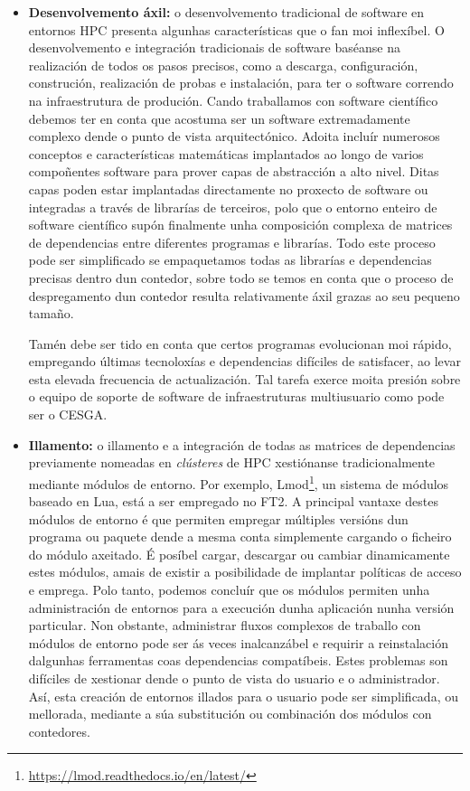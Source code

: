 \begin{itemize}
    \item \textbf{Desenvolvemento áxil:} o desenvolvemento tradicional de software en entornos \gls{HPC} presenta algunhas características que o fan moi inflexíbel. O desenvolvemento e integración tradicionais de software baséanse na realización de todos os pasos precisos, como a descarga, configuración, construción, realización de probas e instalación, para ter o software correndo na infraestrutura de produción. Cando traballamos con software científico debemos ter en conta que acostuma ser un software extremadamente complexo dende o punto de vista arquitectónico. Adoita incluír numerosos conceptos e características matemáticas implantados ao longo de varios compoñentes software para prover capas de abstracción a alto nivel. Ditas capas poden estar implantadas directamente no proxecto de software ou integradas a través de librarías de terceiros, polo que o entorno enteiro de software científico supón finalmente unha composición complexa de matrices de dependencias entre diferentes programas e librarías. Todo este proceso pode ser simplificado se empaquetamos todas as librarías e dependencias precisas dentro dun contedor, sobre todo se temos en conta que o proceso de despregamento dun contedor resulta relativamente áxil grazas ao seu pequeno tamaño.
    
    Tamén debe ser tido en conta que certos programas evolucionan moi rápido, empregando últimas tecnoloxías e dependencias difíciles de satisfacer, ao levar esta elevada frecuencia de actualización. Tal tarefa exerce moita presión sobre o equipo de soporte de software de infraestruturas multiusuario como pode ser o \gls{CESGA}.
    
    \item \textbf{Illamento:} o illamento e a integración de todas as matrices de dependencias previamente nomeadas en \textit{clústeres} de \gls{HPC} xestiónanse tradicionalmente mediante módulos de entorno. Por exemplo, Lmod\footnote{\url{https://lmod.readthedocs.io/en/latest/}}, un sistema de módulos baseado en Lua, está a ser empregado no \gls{FT2}. A principal vantaxe destes módulos de entorno é que permiten empregar múltiples versións dun programa ou paquete dende a mesma conta simplemente cargando o ficheiro do módulo axeitado. É posíbel cargar, descargar ou cambiar dinamicamente estes módulos, amais de existir a posibilidade de implantar políticas de acceso e emprega. Polo tanto, podemos concluír que os módulos permiten unha administración de entornos para a execución dunha aplicación nunha versión particular. Non obstante, administrar fluxos complexos de traballo con módulos de entorno pode ser ás veces inalcanzábel e requirir a reinstalación dalgunhas ferramentas coas dependencias compatíbeis. Estes problemas son difíciles de xestionar dende o punto de vista do usuario e o administrador. Así, esta creación de entornos illados para o usuario pode ser simplificada, ou mellorada, mediante a súa substitución ou combinación dos módulos con contedores.
    

\end{itemize}
